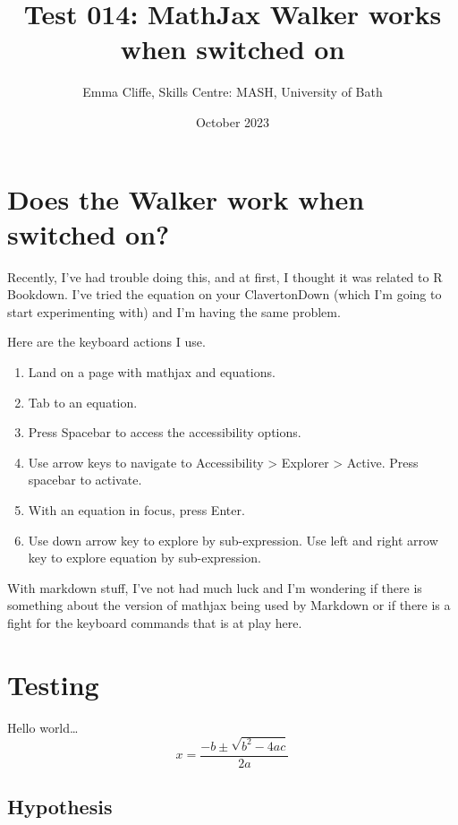 \documentclass[
  10pt,
  a4paper]{article}
\title{Test 014: MathJax Walker works when switched on}
\author{Emma Cliffe, Skills Centre: MASH, University of Bath}
\date{October 2023}
\providecommand{\tightlist}{%
  \setlength{\itemsep}{0pt}\setlength{\parskip}{0pt}}
\begin{document}
\maketitle

\hypertarget{does-the-walker-work-when-switched-on}{%
\section{Does the Walker work when switched on?}\label{does-the-walker-work-when-switched-on}}

Recently, I've had trouble doing this, and at first, I thought it was related to R Bookdown. I've tried the equation on your ClavertonDown (which I'm going to start experimenting with) and I'm having the same problem.

Here are the keyboard actions I use.

\begin{enumerate}
\def\labelenumi{\arabic{enumi}.}
\tightlist
\item
  Land on a page with mathjax and equations.
\item
  Tab to an equation.
\item
  Press Spacebar to access the accessibility options.
\item
  Use arrow keys to navigate to Accessibility \textgreater{} Explorer \textgreater{} Active. Press spacebar to activate.
\item
  With an equation in focus, press Enter.
\item
  Use down arrow key to explore by sub-expression. Use left and right arrow key to explore equation by sub-expression.
\end{enumerate}

With markdown stuff, I've not had much luck and I'm wondering if there is something about the version of mathjax being used by Markdown or if there is a fight for the keyboard commands that is at play here.

\hypertarget{testing}{%
\section{Testing}\label{testing}}

Hello world\ldots{}
\[x = \frac{-b \pm \sqrt{b^2 - 4ac}}{2a}\]

\hypertarget{hypothesis}{%
\subsection{Hypothesis}\label{hypothesis}}
\end{document}
